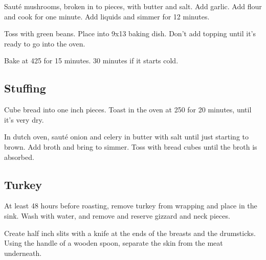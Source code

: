 \begin{recipe}
Sauté mushrooms, broken in to pieces, with butter and salt. Add garlic. Add flour and cook for one minute. Add liquids and simmer for 12 minutes.

Toss with green beans. Place into 9x13 baking dish. Don't add topping until it's ready to go into the oven.

Bake at 425 for 15 minutes. 30 minutes if it starts cold. 

\subsection{Stuffing}



Cube bread into one inch pieces. Toast in the oven at 250\degree{} for 20 minutes, until it's very dry.



In dutch oven, sauté onion and celery in butter with salt until just starting to brown. Add broth and bring to simmer. Toss with bread cubes until the broth is absorbed.

\subsection{Turkey}



At least 48 hours before roasting, remove turkey from wrapping and place in the sink.
Wash with water, and remove and reserve gizzard and neck pieces.

Create half inch slits with a knife at the ends of the breasts and the drumsticks.
Using the handle of a wooden spoon, separate the skin from the meat underneath.


\end{recipe}
